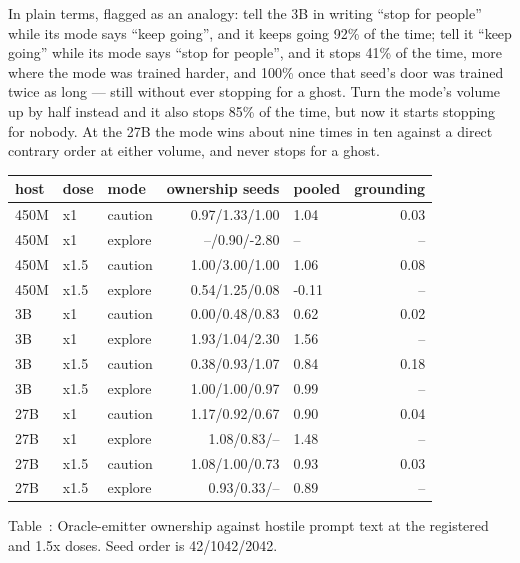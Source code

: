 \documentclass[11pt]{article}
\begin{document}
In plain terms, flagged as an analogy: tell the 3B in writing ``stop for
people'' while its mode says ``keep going'', and it keeps going 92\% of
the time; tell it ``keep going'' while its mode says ``stop for people'',
and it stops 41\% of the time, more where the mode was trained harder,
and 100\% once that seed's door was trained twice as long --- still
without ever stopping for a ghost. Turn the mode's volume up by half
instead and it also stops 85\% of the time, but now it starts stopping
for nobody. At the 27B the mode wins about nine times in ten against a
direct contrary order at either volume, and never stops for a ghost.

\par\medskip

\begin{center}
{\scriptsize
\setlength{\tabcolsep}{3pt}%
\begin{tabular}{lllrlr}
\toprule
host & dose & mode & ownership seeds & pooled & grounding \\
\midrule
450M & x1 & caution & 0.97/1.33/1.00 & 1.04 & 0.03 \\
450M & x1 & explore & --/0.90/-2.80 & -- & -- \\
450M & x1.5 & caution & 1.00/3.00/1.00 & 1.06 & 0.08 \\
450M & x1.5 & explore & 0.54/1.25/0.08 & -0.11 & -- \\
3B & x1 & caution & 0.00/0.48/0.83 & 0.62 & 0.02 \\
3B & x1 & explore & 1.93/1.04/2.30 & 1.56 & -- \\
3B & x1.5 & caution & 0.38/0.93/1.07 & 0.84 & 0.18 \\
3B & x1.5 & explore & 1.00/1.00/0.97 & 0.99 & -- \\
27B & x1 & caution & 1.17/0.92/0.67 & 0.90 & 0.04 \\
27B & x1 & explore & 1.08/0.83/-- & 1.48 & -- \\
27B & x1.5 & caution & 1.08/1.00/0.73 & 0.93 & 0.03 \\
27B & x1.5 & explore & 0.93/0.33/-- & 0.89 & -- \\
\bottomrule
\end{tabular}
}
\end{center}
\noindent Table~\thetable: Oracle-emitter ownership against hostile prompt text at the registered and 1.5x doses. Seed order is 42/1042/2042.
\label{tab:ownership}
\par
\end{document}
